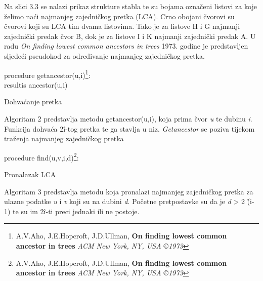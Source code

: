 \documentclass[times, utf8, zavrsni]{fer}
\begin{document}
{Na slici 3.3 se nalazi prikaz strukture stabla te su bojama označeni listovi za koje želimo naći najmanjeg zajedničkog pretka (LCA). Crno obojani čvorovi su čvorovi koji su LCA tim dvama listovima. Tako je za listove H i G najmanji zajednički predak čvor B, dok je za listove I i K najmanji zajednički predak A. U radu \textit{On finding lowest common ancestors in trees} 1973. godine je predstavljen sljedeći pseudokod za određivanje najmanjeg zajedničkog pretka.
\newline
\newline
\begin{algorithm}[H]
	
	
	procedure getancestor(u,i)\footnote[1]{A.V.Aho, J.E.Hopcroft, J.D.Ullman, \textbf{On finding lowest common ancestor in trees} \textit{ACM New York, NY, USA ©1973}}:\\

	
		resultis ancestor(u,i)\;
	\caption{Dohvaćanje pretka}
	\label{LCA algoritam 1}
\end{algorithm}
Algoritam 2 predstavlja metodu getancestor(u,i), koja prima čvor \textit{u} te dubinu \textit{i}. Funkcija dohvaća 2\^ i-tog pretka te ga stavlja u niz. \textit{Getancestor} se poziva tijekom traženja najmanjeg zajedničkog pretka
\newline
\newline
\begin{algorithm}[H]

		procedure find(u,v,i,d)\footnote[2]{A.V.Aho, J.E.Hopcroft, J.D.Ullman, \textbf{On finding lowest common ancestor in trees} \textit{ACM New York, NY, USA ©1973}}:\\
	\caption{Pronalazak LCA}
	\label{LCA algorithm 2}
	
\end{algorithm}

Algoritam 3 predstavlja metodu koja pronalazi najmanjeg zajedničkog pretka za ulazne podatke \textit{u} i \textit{v} koji su na dubini \textit{d}. Početne pretpostavke su da je \textit{d} > 2 \^(i-1) te su im 2\^i-ti preci jednaki ili ne postoje.

}
\end{document}
